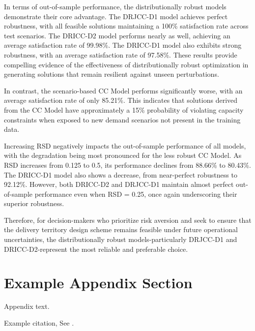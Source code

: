 \documentclass[preprint,12pt,authoryear]{elsarticle}
\begin{document}
In terms of out-of-sample performance, the distributionally robust models demonstrate their core advantage. The DRJCC-D1 model achieves perfect robustness, with all feasible solutions maintaining a 100\% satisfaction rate across test scenarios. The DRICC-D2 model performs nearly as well, achieving an average satisfaction rate of 99.98\%. The DRICC-D1 model also exhibits strong robustness, with an average satisfaction rate of 97.58\%. These results provide compelling evidence of the effectiveness of distributionally robust optimization in generating solutions that remain resilient against unseen perturbations. 

In contrast, the scenario-based CC Model performs significantly worse, with an average satisfaction rate of only 85.21\%. This indicates that solutions derived from the CC Model have approximately a 15\% probability of violating capacity constraints when exposed to new demand scenarios not present in the training data.

Increasing RSD negatively impacts the out-of-sample performance of all models, with the degradation being most pronounced for the less robust CC Model. As RSD increases from 0.125 to 0.5, its performance declines from 88.66\% to 80.43\%. The DRICC-D1 model also shows a decrease, from near-perfect robustness to 92.12\%. However, both DRICC-D2 and DRJCC-D1 maintain almost perfect out-of-sample performance even when RSD = 0.25, once again underscoring their superior robustness.

Therefore, for decision-makers who prioritize risk aversion and seek to ensure that the delivery territory design scheme remains feasible under future operational uncertainties, the distributionally robust models-particularly DRJCC-D1 and DRICC-D2-represent the most reliable and preferable choice.




\appendix
\section{Example Appendix Section}
\label{app1}

Appendix text.

Example citation, See \citet{lamport94}.

\end{document}
